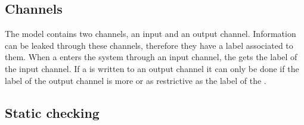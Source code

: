 \subsection{Channels}
The model contains two channels, an input and an output channel.
Information can be leaked through these channels, therefore they have a label associated to them.
When a \xvalue{} enters the system through an input channel, the \xvalue{} gets the label of the input channel.
If a \xvalue{} is written to an output channel it can only be done if the label of the output channel is more or as restrictive as the label of the \xvalue{}.

\subsection{Static checking}
